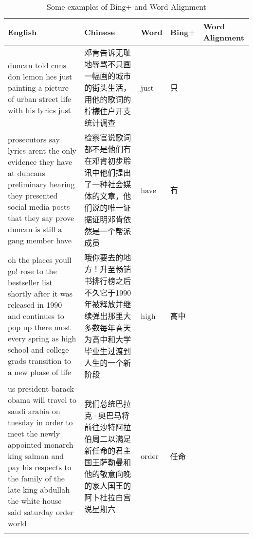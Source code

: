 \documentclass[11pt]{article}
\begin{document}
\begin{longtable}{| p{5cm} | p{5cm} | p{1cm} | p{1cm} | p{1.5cm} |}   
  \hline
  English & Chinese & Word & Bing+ & Word Alignment \\
  \hline
  duncan told cnns don lemon hes just painting a picture of urban street life with his lyrics just & 邓肯告诉无耻地辱骂不只画一幅画的城市的街头生活，用他的歌词的柠檬住户开支统计调查 & just & 只 & \\ 
  \hline
  prosecutors say lyrics arent the only evidence they have at duncans preliminary hearing they presented social media posts that they say prove duncan is still a gang member have & 检察官说歌词都不是他们有在邓肯初步聆讯中他们提出了一种社会媒体的文章，他们说的唯一证据证明邓肯依然是一个帮派成员 & have & 有 & \\
  \hline
  oh the places youll go! rose to the bestseller list shortly after it was released in 1990 and continues to pop up there most every spring as high school and college grads transition to a new phase of life & 哦你要去的地方！升至畅销书排行榜之后不久它于1990年被释放并继续弹出那里大多数每年春天为高中和大学毕业生过渡到人生的一个新阶段 & high & 高中 & \\
  \hline
  us president barack obama will travel to saudi arabia on tuesday in order to meet the newly appointed monarch king salman and pay his respects to the family of the late king abdullah the white house said saturday order world & 我们总统巴拉克·奥巴马将前往沙特阿拉伯周二以满足新任命的君主国王萨勒曼和他的敬意向晚的家人国王的阿卜杜拉白宫说星期六 & order & 任命 & \\
  \hline
  \caption{Some examples of Bing+ and Word Alignment}
  \label{table:evaluation_2}
\end{longtable}
\end{document}
